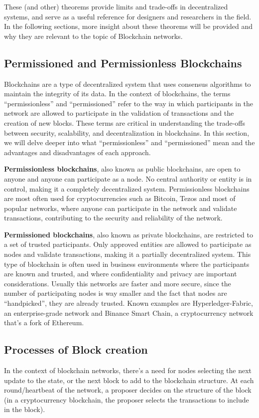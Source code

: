 These (and other) theorems provide limits and trade-offs in decentralized systems, and serve as a useful reference for designers and researchers in the field.
In the following sections, more insight about these theorems will be provided and why they are relevant to the topic of Blockchain networks.

\subsection*{Permissioned and Permissionless Blockchains}

Blockchains are a type of decentralized system that uses consensus algorithms to maintain the integrity of its data. In the context of blockchains, the terms ``permissionless'' and ``permissioned'' refer to the way in which participants in the network are allowed to participate in the validation of transactions and the creation of new blocks.
These terms are critical in understanding the trade-offs between security, scalability, and decentralization in blockchains. In this section, we will delve deeper into what ``permissionless'' and ``permissioned'' mean and the advantages and disadvantages of each approach.

\textbf{Permissionless blockchains}, also known as public blockchains, are open to anyone and anyone can participate as a node. No central authority or entity is in control, making it a completely decentralized system. Permissionless blockchains are most often used for cryptocurrencies such as Bitcoin, Tezos and most of popular networks, where anyone can participate in the network and validate transactions, contributing to the security and reliability of the network.

\textbf{Permissioned blockchains}, also known as private blockchains, are restricted to a set of trusted participants. Only approved entities are allowed to participate as nodes and validate transactions, making it a partially decentralized system. This type of blockchain is often used in business environments where the participants are known and trusted, and where confidentiality and privacy are important considerations. Usually this networks are faster and more secure, since the number of participating nodes is way smaller and the fact that nodes are ``handpicked'', they are already trusted.
Known examples are Hyperledger-Fabric, an enterprise-grade network and Binance Smart Chain, a cryptocurrency network that's a fork of Ethereum.

\subsection*{Processes of Block creation}
In the context of blockchain networks, there's a need for nodes selecting the next update to the state, or the next block to add to the blockchain structure. At each round/heartbeat of the network, a proposer decides on the structure of the block (in a cryptocurrency blockchain, the proposer selects the transactions to include in the block).

